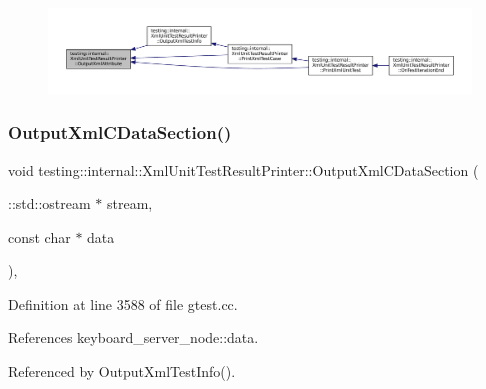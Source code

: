 \nopagebreak
\begin{figure}[H]
\begin{center}
\leavevmode
\includegraphics[width=350pt]{classtesting_1_1internal_1_1XmlUnitTestResultPrinter_aa8ca7066de948d26d171597430c75839_icgraph}
\end{center}
\end{figure}
\mbox{\label{classtesting_1_1internal_1_1XmlUnitTestResultPrinter_a41bccd75f54932c5b3b8cce1f94dbd54}} 
\subsubsection{\texorpdfstring{Output\+Xml\+C\+Data\+Section()}{OutputXmlCDataSection()}}
{\footnotesize\ttfamily void testing\+::internal\+::\+Xml\+Unit\+Test\+Result\+Printer\+::\+Output\+Xml\+C\+Data\+Section (\begin{DoxyParamCaption}\item[{\+::std\+::ostream $\ast$}]{stream,  }\item[{const char $\ast$}]{data }\end{DoxyParamCaption})\hspace{0.3cm}{\ttfamily [static]}, {\ttfamily [private]}}



Definition at line 3588 of file gtest.\+cc.



References keyboard\+\_\+server\+\_\+node\+::data.



Referenced by Output\+Xml\+Test\+Info().


